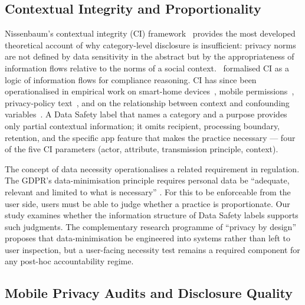 \documentclass[11pt,a4paper]{article}
\begin{document}
\subsection{Contextual Integrity and Proportionality}
\label{subsec:rw-contextual-integrity}

Nissenbaum's contextual integrity (CI) framework~\citep{nissenbaum:2004,
nissenbaum:2010} provides the most developed theoretical account of why
category-level disclosure is insufficient: privacy norms are not defined
by data sensitivity in the abstract but by the appropriateness of
information flows relative to the norms of a social
context.~\citet{barth:etal:2006} formalised CI as a logic of information
flows for compliance reasoning. CI has since been operationalised in
empirical work on smart-home devices~\citep{apthorpe:etal:2018}, mobile
permissions~\citep{wijesekera:etal:2015,wijesekera:etal:2017},
privacy-policy text~\citep{shvartzshnaider:etal:2019}, and on the
relationship between context and confounding
variables~\citep{martin:nissenbaum:2017}. A Data Safety label that names
a category and a purpose provides only partial contextual information; it
omits recipient, processing boundary, retention, and the specific app
feature that makes the practice necessary --- four of the five CI
parameters (actor, attribute, transmission principle, context).

The concept of data necessity operationalises a related requirement in
regulation. The GDPR's data-minimisation principle requires personal data
be ``adequate, relevant and limited to what is necessary''
\citep{gdpr:2016}. For this to be enforceable from the user side, users
must be able to judge whether a practice is proportionate. Our study
examines whether the information structure of Data Safety labels
supports such judgments. The complementary research programme of
``privacy by design''~\citep{spiekermann:cranor:2009,cavoukian:2009}
proposes that data-minimisation be engineered into systems rather than
left to user inspection, but a user-facing necessity test remains a
required component for any post-hoc accountability regime.

\subsection{Mobile Privacy Audits and Disclosure Quality}
\label{subsec:rw-audits}
\end{document}
